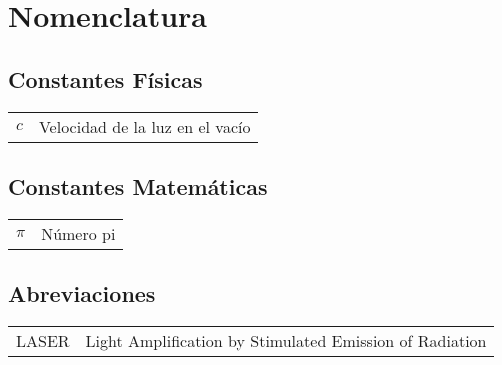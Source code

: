 \tableofcontents
\newpage

\listoffigures
\newpage

\chapter*{Nomenclatura}
\section*{Constantes Físicas}
\begin{tabular}{l l}
$ c $ & Velocidad de la luz en el vacío \\
\end{tabular}

\section*{Constantes Matem\'aticas}
\begin{tabular}{l l}
	$ \pi $ & Número pi \\
\end{tabular}


\section*{Abreviaciones}
\begin{tabular}{l l}
	LASER & Light Amplification by Stimulated Emission of Radiation \\
\end{tabular}